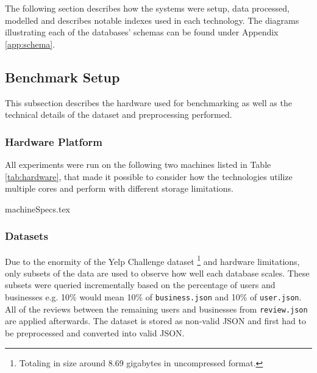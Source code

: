 The following section describes how the systems were setup, data processed, modelled and describes notable indexes used in each technology. The diagrams illustrating each of the databases' schemas can be found under Appendix \ref{app:schema}.

\subsection{Benchmark Setup}

This subsection describes the hardware used for benchmarking as well as the technical details of the dataset and preprocessing performed.

\subsubsection{Hardware Platform}
All experiments were run on the following two machines listed in Table \ref{tab:hardware}, that made it possible to consider how the technologies utilize multiple cores and perform with different storage limitations.

\begin{table*}[h]
    \centering
    \small
    \caption{The specifications of the two machines used to benchmark database performance. Setup 1 makes use of AMD Ryzen 5 2600 whereas Setup 2 is an AWS c5.4xlarge instance with Intel Xeon Platinum 8000 series CPUs.}
    \vspace*{5mm}
    {machineSpecs.tex}
    \label{tab:hardware}
\end{table*}

\subsubsection{Datasets}


Due to the enormity of the Yelp Challenge dataset \cite{yelpDataset}\footnote{Totaling in size around 8.69 gigabytes in uncompressed format.} and hardware limitations, only subsets of the data are used to observe how well each database scales. These subsets were queried incrementally based on the percentage of users and businesses e.g. 10\% would mean 10\% of \texttt{business.json} and 10\% of \texttt{user.json}. All of the reviews between the remaining users and businesses from \texttt{review.json} are applied afterwards. The dataset is stored as non-valid JSON and first had to be preprocessed and converted into valid JSON.

